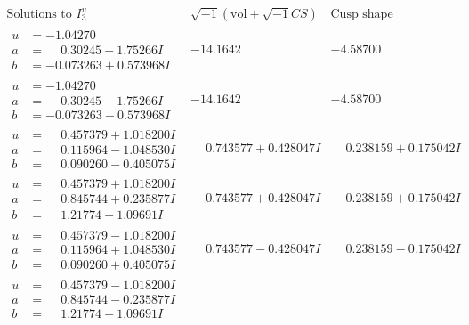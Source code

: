 \documentclass[1p]{elsarticle_modified}
\theoremstyle{definition}
\newcommand{\I}{\sqrt{-1}}
\begin{document}
$$\begin{array}{c|c|c}  
\text{Solutions to }I^u_{3}& \I (\text{vol} + \sqrt{-1}CS) & \text{Cusp shape}\\
 \hline 
\begin{aligned}
u &= -1.04270\phantom{ +0.000000I} \\
a &= \phantom{-}0.30245 + 1.75266 I \\
b &= -0.073263 + 0.573968 I\end{aligned}
 & -14.1642\phantom{ +0.000000I} & -4.58700\phantom{ +0.000000I} \\ \hline\begin{aligned}
u &= -1.04270\phantom{ +0.000000I} \\
a &= \phantom{-}0.30245 - 1.75266 I \\
b &= -0.073263 - 0.573968 I\end{aligned}
 & -14.1642\phantom{ +0.000000I} & -4.58700\phantom{ +0.000000I} \\ \hline\begin{aligned}
u &= \phantom{-}0.457379 + 1.018200 I \\
a &= \phantom{-}0.115964 - 1.048530 I \\
b &= \phantom{-}0.090260 - 0.405075 I\end{aligned}
 & \phantom{-}0.743577 + 0.428047 I & \phantom{-}0.238159 + 0.175042 I \\ \hline\begin{aligned}
u &= \phantom{-}0.457379 + 1.018200 I \\
a &= \phantom{-}0.845744 + 0.235877 I \\
b &= \phantom{-}1.21774 + 1.09691 I\end{aligned}
 & \phantom{-}0.743577 + 0.428047 I & \phantom{-}0.238159 + 0.175042 I \\ \hline\begin{aligned}
u &= \phantom{-}0.457379 - 1.018200 I \\
a &= \phantom{-}0.115964 + 1.048530 I \\
b &= \phantom{-}0.090260 + 0.405075 I\end{aligned}
 & \phantom{-}0.743577 - 0.428047 I & \phantom{-}0.238159 - 0.175042 I \\ \hline\begin{aligned}
u &= \phantom{-}0.457379 - 1.018200 I \\
a &= \phantom{-}0.845744 - 0.235877 I \\
b &= \phantom{-}1.21774 - 1.09691 I\end{aligned}

\end{array}$$
\end{document}

